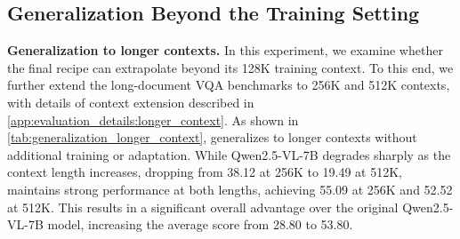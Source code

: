 \subsection{Generalization Beyond the Training Setting}
\label{sec:final_results:generalization}

\noindent\textbf{Generalization to longer contexts.} In this experiment, we examine whether the final \modelname recipe can extrapolate beyond its 128K training context.
To this end, we further extend the long-document VQA benchmarks to 256K and 512K contexts, with details of context extension described in \cref{app:evaluation_details:longer_context}.
As shown in \cref{tab:generalization_longer_context}, \modelname generalizes to longer contexts without additional training or adaptation.
While Qwen2.5-VL-7B degrades sharply as the context length increases, dropping from 38.12 at 256K to 19.49 at 512K, \modelname maintains strong performance at both lengths, achieving 55.09 at 256K and 52.52 at 512K.
This results in a significant overall advantage over the original Qwen2.5-VL-7B model, increasing the average score from 28.80 to 53.80.

\begin{table}[t]
\centering
\caption{We evaluate the final 128K \modelname at 256K and 512K without additional training or adaptation.
MMLongBench-Doc (MMLB-D), LongDocURL (LD-URL), and SlideVQA (SLIDE) are reported in order. Some baselines fail on 512K SlideVQA due to the large number of images.
}
\label{tab:generalization_longer_context}
\setlength{\tabcolsep}{4pt}
\end{table}

